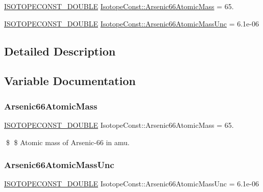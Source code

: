 \begin{DoxyCompactItemize}
\item 
\mbox{\hyperlink{group___isotope_const-_macros_ga8f45a7272ce02c0b4c65c44636ed719a}{I\+S\+O\+T\+O\+P\+E\+C\+O\+N\+S\+T\+\_\+\+D\+O\+U\+B\+LE}} \mbox{\hyperlink{group___isotope_const-_arsenic-_as66_gad33d25d13e26ce83efdf928aa20fc7a9}{Isotope\+Const\+::\+Arsenic66\+Atomic\+Mass}} = 65.
\item 
\mbox{\hyperlink{group___isotope_const-_macros_ga8f45a7272ce02c0b4c65c44636ed719a}{I\+S\+O\+T\+O\+P\+E\+C\+O\+N\+S\+T\+\_\+\+D\+O\+U\+B\+LE}} \mbox{\hyperlink{group___isotope_const-_arsenic-_as66_gaedfbbc4269797281f4a05c9e78b814a4}{Isotope\+Const\+::\+Arsenic66\+Atomic\+Mass\+Unc}} = 6.\+1e-\/06
\end{DoxyCompactItemize}


\subsection{Detailed Description}


\subsection{Variable Documentation}
\mbox{\label{group___isotope_const-_arsenic-_as66_gad33d25d13e26ce83efdf928aa20fc7a9}} 
\subsubsection{\texorpdfstring{Arsenic66\+Atomic\+Mass}{Arsenic66AtomicMass}}
{\footnotesize\ttfamily \mbox{\hyperlink{group___isotope_const-_macros_ga8f45a7272ce02c0b4c65c44636ed719a}{I\+S\+O\+T\+O\+P\+E\+C\+O\+N\+S\+T\+\_\+\+D\+O\+U\+B\+LE}} Isotope\+Const\+::\+Arsenic66\+Atomic\+Mass = 65.}

\$ \$ Atomic mass of Arsenic-\/66 in amu. \mbox{\label{group___isotope_const-_arsenic-_as66_gaedfbbc4269797281f4a05c9e78b814a4}} 
\subsubsection{\texorpdfstring{Arsenic66\+Atomic\+Mass\+Unc}{Arsenic66AtomicMassUnc}}
{\footnotesize\ttfamily \mbox{\hyperlink{group___isotope_const-_macros_ga8f45a7272ce02c0b4c65c44636ed719a}{I\+S\+O\+T\+O\+P\+E\+C\+O\+N\+S\+T\+\_\+\+D\+O\+U\+B\+LE}} Isotope\+Const\+::\+Arsenic66\+Atomic\+Mass\+Unc = 6.\+1e-\/06}

